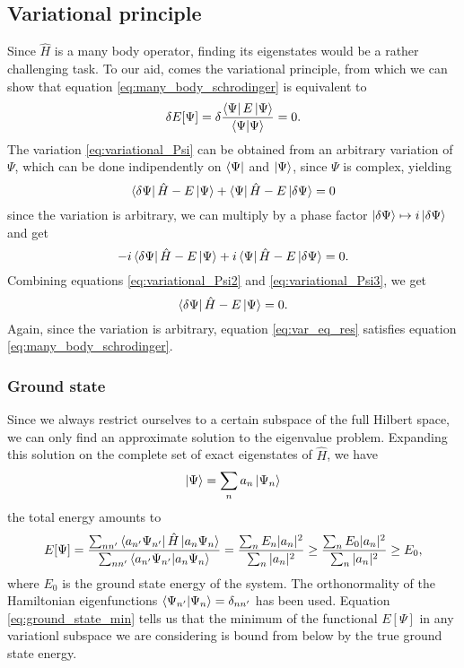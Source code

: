 \subsection{Variational principle}
Since $\hat H$ is a many body operator, finding its eigenstates would be a rather challenging task. To our aid, comes the variational principle, from which we can show that equation \eqref{eq:many_body_schrodinger} is equivalent to 
\begin{equation}
    \label{eq:variational_Psi}
    \delta E[\Psi] = \delta \frac{\bra{\Psi} E \ket{\Psi}}{\bra{\Psi}\ket{\Psi}} = 0.
\end{equation}
The variation \eqref{eq:variational_Psi} can be obtained from an arbitrary variation of $\Psi$, which can be done indipendently on $\bra{\Psi}$ and $\ket{\Psi}$, since $\Psi$ is complex, yielding
\begin{equation}
    \label{eq:variational_Psi2}
    \bra{\delta \Psi} \hat H  -E\ket{\Psi} + \bra{\Psi} \hat H-E \ket{\delta \Psi} = 0
\end{equation}
since the variation is arbitrary, we can multiply by a phase factor $\ket{\delta \Psi}\mapsto i\ket{\delta \Psi}$ and get
\begin{equation}
    \label{eq:variational_Psi3}
    -i\bra{\delta \Psi} \hat H-E \ket{\Psi} + i\bra{\Psi} \hat H-E \ket{\delta \Psi} = 0.
\end{equation}
Combining equations \eqref{eq:variational_Psi2} and \eqref{eq:variational_Psi3}, we get
\begin{equation}
    \label{eq:var_eq_res}
    \bra{\delta \Psi} \hat H-E \ket{\Psi} = 0.
\end{equation}
Again, since the variation is arbitrary, equation \eqref{eq:var_eq_res} satisfies equation \eqref{eq:many_body_schrodinger}.
\subsubsection{Ground state}
Since we always restrict ourselves to a certain subspace of the full Hilbert space, we can only find an approximate solution to the eigenvalue problem. Expanding this solution on the complete set of exact eigenstates of $\hat H$, we have
\begin{equation}
    \label{eq:expansion_gs}
    \ket\Psi = \sum_n a_n \ket{\Psi_n}    
\end{equation}
the total energy amounts to 
\begin{equation}
    \label{eq:ground_state_min}
    E[\Psi] = \frac{\sum_{nn'}\bra {a_{n'}\Psi_{n'}}\hat H \ket{a_n \Psi_n}}{\sum_{nn'}\bra{a_{n'}\Psi_{n'}}\ket{a_n\Psi_{n}}} = \frac{\sum_{n}E_n|a_n|^2}{\sum_n|a_n|^2}\ge \frac{\sum_{n}E_0|a_n|^2}{\sum_n|a_n|^2}\ge E_0,
\end{equation}
where $E_0$ is the ground state energy of the system. The orthonormality of the Hamiltonian eigenfunctions $\bra{\Psi_{n'}}\ket{\Psi_n}=\delta_{nn'}$ has been used. Equation \eqref{eq:ground_state_min} tells us that the minimum of the functional $E[\Psi]$ in any variationl subspace we are considering is bound from below by the true ground state energy.
